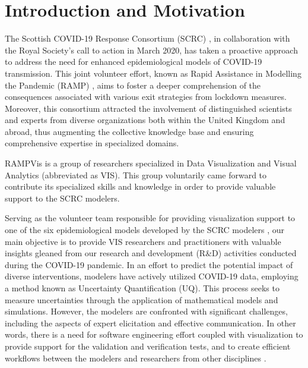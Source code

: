 \section{Introduction and Motivation}
\label{sec:intro}

The Scottish COVID-19 Response Consortium (SCRC) \cite{2020University}, in collaboration with the Royal Society's call to action in March 2020, has taken a proactive approach to address the need for enhanced epidemiological models of COVID-19 transmission.
This joint volunteer effort, known as Rapid Assistance in Modelling the Pandemic (RAMP) \cite{2020Rapid}, aims to foster a deeper comprehension of the consequences associated with various exit strategies from lockdown measures.
Moreover, this consortium attracted the involvement of distinguished scientists and experts from diverse organizations both within the United Kingdom and abroad, thus augmenting the collective knowledge base and ensuring comprehensive expertise in specialized domains.

RAMPVis \cite{2020Visualization} is a group of researchers specialized in Data Visualization and Visual Analytics (abbreviated as VIS).
This group voluntarily came forward to contribute its specialized skills and knowledge in order to provide valuable support to the SCRC modelers.

Serving as the volunteer team responsible for providing visualization support to one of the six epidemiological models developed by the SCRC modelers \cite{chen2022RAMPVIS}, our main objective is to provide VIS researchers and practitioners with valuable insights gleaned from our research and development (R\&D) activities conducted during the COVID-19 pandemic.
In an effort to predict the potential impact of diverse interventions, modelers have actively utilized COVID-19 data, employing a method known as Uncertainty Quantification (UQ).
This process seeks to measure uncertainties through the application of mathematical models and simulations.
However, the modelers are confronted with significant challenges, including the aspects of expert elicitation and effective communication.
In other words, there is a need for software engineering effort coupled with visualization to provide support for the validation and verification tests, and to create efficient workflows between the modelers and researchers from other disciplines \cite{ackland2022Royal}.

